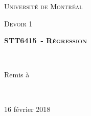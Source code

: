 \documentclass[10pt,letterpaper]{article}
\newcommand{\TypeRemise}{Devoir 1}
\newcommand{\sigleCours}{STT6415}
\newcommand{\titreCours}{Régression}
\newcommand{\dateremise}{16 février 2018}
\begin{document}
\begin{titlepage}
	\centering
	{\scshape\LARGE Université de Montréal \par}
	\vspace{1cm}
	{\scshape\Large \TypeRemise \par}
	\vspace{1.5cm}
	{\huge\bfseries \sigleCours \ - \textsc{\titreCours} \par}
	\vspace{2cm}
	{\Large\itshape \CoUn \\ \CoDeux \par}
	\vfill
	Remis à \par
	{\Large\itshape \NomProf \\}

	\vfill

	{\large \dateremise \par}
\end{titlepage}
\clearpage

\end{document}

